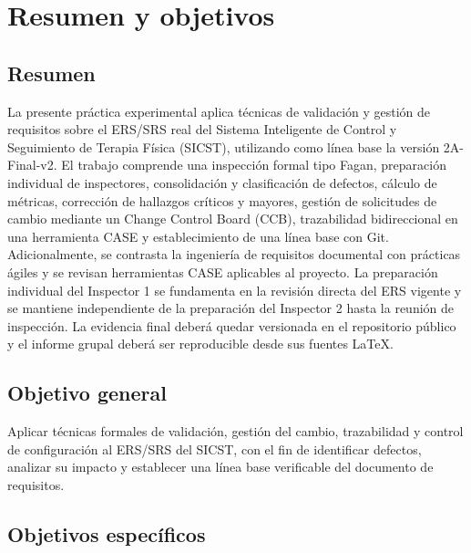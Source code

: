 \documentclass[12pt,a4paper]{article}
\newcommand{\Sistema}{Sistema Inteligente de Control y Seguimiento de Terapia Física}
\newcommand{\Sigla}{SICST}
\newcommand{\VersionERS}{2A-Final-v2}
\begin{document}
\setcounter{page}{1}
\tableofcontents
\clearpage
\listoftables
\clearpage
{}
\setcounter{page}{1}


\section{Resumen y objetivos}

\subsection{Resumen}

La presente práctica experimental aplica técnicas de validación y gestión de requisitos sobre el ERS/SRS real del \Sistema{} (\Sigla), utilizando como línea base la versión \VersionERS. El trabajo comprende una inspección formal tipo Fagan, preparación individual de inspectores, consolidación y clasificación de defectos, cálculo de métricas, corrección de hallazgos críticos y mayores, gestión de solicitudes de cambio mediante un Change Control Board (CCB), trazabilidad bidireccional en una herramienta CASE y establecimiento de una línea base con Git. Adicionalmente, se contrasta la ingeniería de requisitos documental con prácticas ágiles y se revisan herramientas CASE aplicables al proyecto. La preparación individual del Inspector 1 se fundamenta en la revisión directa del ERS vigente y se mantiene independiente de la preparación del Inspector 2 hasta la reunión de inspección. La evidencia final deberá quedar versionada en el repositorio público y el informe grupal deberá ser reproducible desde sus fuentes \LaTeX.

\subsection{Objetivo general}

Aplicar técnicas formales de validación, gestión del cambio, trazabilidad y control de configuración al ERS/SRS del \Sigla{}, con el fin de identificar defectos, analizar su impacto y establecer una línea base verificable del documento de requisitos.

\subsection{Objetivos específicos}
\end{document}
